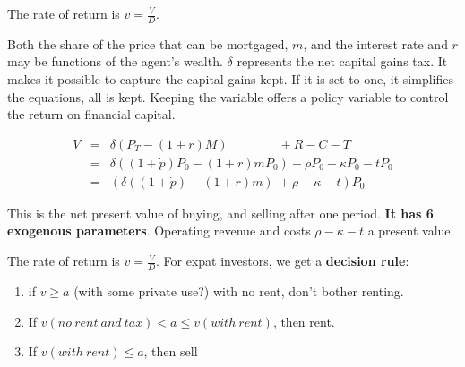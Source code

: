 The rate of return is $v = \frac{V}{D}$. 

Both the  share of the price  that can be mortgaged, $m$, and the interest rate  and $r$ may be functions of the agent's wealth. $\delta$ represents the net capital gains tax. It makes it possible to capture the capital gains kept. If it is set to one, it simplifies the equations, all is kept. Keeping the variable offers a policy variable to control the return on financial capital.

\begin{eqnarray*}
V  %
&=& \delta(P_T- (1+r)M) \qquad \qquad 	 + R  	-C   - T\\
&=& \delta((1+\dot p)  P_0- (1+r)mP_0)   + \rho P_0  	-\kappa P_0 - tP_0\\
&=&( \delta((1+\dot p)  - (1+r)m) \ + \rho   	-\kappa -t) P_0
\end{eqnarray*}

This is the  net present value of buying, and selling after one period. \textbf{It has  6 exogenous parameters}. Operating revenue and costs $ \rho -\kappa - t$ a present value. 

The rate of return is $v = \frac{V}{D}$. For expat investors, we get a \textbf{decision rule}:\begin{enumerate}
\item  if $v \geq a$ (with some private use?) with no rent,  don't bother renting. 
\item If $v(no\ rent\ and\ tax) < a\leq v(with\ rent)$,  then  rent. 
\item If $ v(with\ rent) \le a $,  then sell 
\end{enumerate}

